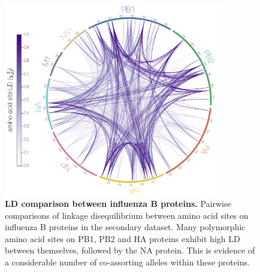 \documentclass[11pt,oneside,letterpaper]{article}
\begin{document}
\begin{figure}[h]
	\centering	
	\includegraphics[width=0.85\textwidth]{supp_figures/InfB_LDcircle.1600.aa.ChiSqdf.minorCutoff1percent.png}
	\caption{\textbf{LD comparison between influenza B proteins.}
Pairwise comparisons of linkage disequilibrium between amino acid sites on influenza B proteins in the secondary dataset.
Many polymorphic amino acid sites on PB1, PB2 and HA proteins exhibit high LD between themselves, followed by the NA protein.
This is evidence of a considerable number of co-assorting alleles within these proteins.}
	\label{segmentLD}
\end{figure}
\end{document}

